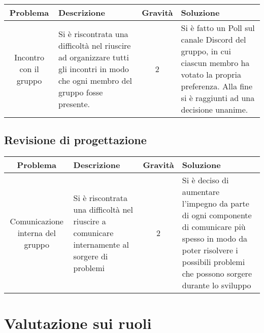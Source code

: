 \quad
\def\tabularxcolumn#1{m{#1}}
{
	
	\begin{center}
		\renewcommand{\arraystretch}{1.4}
		\begin{tabularx}{\textwidth}{|c|X|c|X|}
			\hline
			\rowcolor{airforceblue}
			\textbf{Problema} & \textbf{Descrizione} & \textbf{Gravità} & \textbf{Soluzione}\\
			\hline
			Incontro con il gruppo & Si è riscontrata una difficoltà nel riuscire ad organizzare tutti gli incontri in modo che ogni membro del gruppo fosse presente. & 2 & Si è fatto un Poll sul canale Discord del gruppo, in cui ciascun membro ha votato la propria preferenza. Alla fine si è raggiunti ad una decisione unanime. \\
			 \hline
		\end{tabularx}
	\end{center}

\subsection{Revisione di progettazione}\label{ValutazionePerIlMiglioramentoValutazioneSuOrganizzazioneRevisioneDiProgettazione}

\quad
\def\tabularxcolumn#1{m{#1}}
{
	
	\begin{center}
		\renewcommand{\arraystretch}{1.4}
		\begin{tabularx}{\textwidth}{|c|X|c|X|}
			\hline
			\rowcolor{airforceblue}
			\textbf{Problema} & \textbf{Descrizione} & \textbf{Gravità} & \textbf{Soluzione}\\
			\hline
			Comunicazione interna del gruppo & Si è riscontrata una difficoltà nel riuscire a comunicare internamente al sorgere di problemi & 2 & Si è deciso di aumentare l'impegno da parte di ogni componente di comunicare più spesso in modo da poter risolvere i possibili problemi che possono sorgere durante lo sviluppo \\
			\hline
		\end{tabularx}
	\end{center}

\section{Valutazione sui ruoli}  \label{ValutazionePerIlMiglioramentoValutazioneSuiRuoli}

}}
